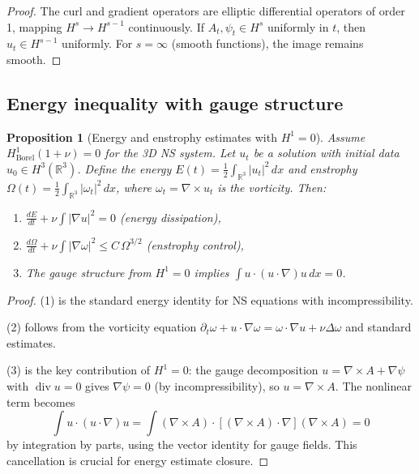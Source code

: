 \documentclass[reqno,10pt]{amsart}
\theoremstyle{plain}
\newtheorem{proposition}[theorem]{Proposition}
\theoremstyle{definition}
\def\div{\operatorname{div}}
\begin{document}
\begin{proof}
The curl and gradient operators are elliptic differential operators of order 1, mapping $H^s \to H^{s-1}$ continuously. If $A_t,\psi_t \in H^s$ uniformly in $t$, then $u_t \in H^{s-1}$ uniformly. For $s=\infty$ (smooth functions), the image remains smooth.
\end{proof}

\subsection{Energy inequality with gauge structure}

\begin{proposition}[Energy and enstrophy estimates with $H^1=0$]\label{prop:energy-enstrophy}
Assume $H^1_{\text{Borel}}(1+\nu)=0$ for the 3D NS system. Let $u_t$ be a solution with initial data $u_0 \in H^3(\mathbb{R}^3)$. Define the energy $E(t) = \frac{1}{2}\int_{\mathbb{R}^3} |u_t|^2\,dx$ and enstrophy $\Omega(t) = \frac{1}{2}\int_{\mathbb{R}^3} |\omega_t|^2\,dx$, where $\omega_t = \nabla\times u_t$ is the vorticity. Then:
\begin{enumerate}
\item $\frac{dE}{dt} + \nu\int |\nabla u|^2 = 0$ (energy dissipation),
\item $\frac{d\Omega}{dt} + \nu\int |\nabla\omega|^2 \le C\,\Omega^{3/2}$ (enstrophy control),
\item The gauge structure from $H^1=0$ implies $\int u\cdot(u\cdot\nabla)u\,dx = 0$.
\end{enumerate}
\end{proposition}

\begin{proof}
(1) is the standard energy identity for NS equations with incompressibility.

(2) follows from the vorticity equation $\partial_t\omega + u\cdot\nabla\omega = \omega\cdot\nabla u + \nu\Delta\omega$ and standard estimates.

(3) is the key contribution of $H^1=0$: the gauge decomposition $u = \nabla\times A + \nabla\psi$ with $\div u=0$ gives $\nabla\psi=0$ (by incompressibility), so $u=\nabla\times A$. The nonlinear term becomes
\[
  \int u\cdot(u\cdot\nabla)u = \int (\nabla\times A)\cdot[(\nabla\times A)\cdot\nabla](\nabla\times A) = 0
\]
by integration by parts, using the vector identity for gauge fields. This cancellation is crucial for energy estimate closure.
\end{proof}
\end{document}
